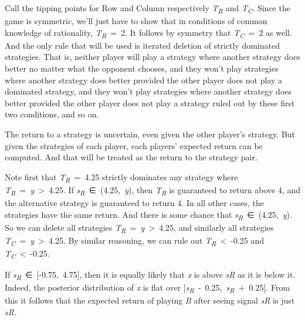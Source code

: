 \documentclass[
  12pt,
  letterpaper,
]{scrbook}
\begin{document}
Call the tipping points for Row and Column respectively
\emph{T\textsubscript{R}} and \emph{T\textsubscript{C}}. Since the game
is symmetric, we'll just have to show that in conditions of common
knowledge of rationality, \emph{T\textsubscript{R}}~=~2. It follows by
symmetry that \emph{T\textsubscript{C}}~=~2 as well. And the only rule
that will be used is iterated deletion of strictly dominated strategies.
That is, neither player will play a strategy where another strategy does
better no matter what the opponent chooses, and they won't play
strategies where another strategy does better provided the other player
does not play a dominated strategy, and they won't play strategies where
another strategy does better provided the other player does not play a
strategy ruled out by these first two conditions, and so on.

The return to a strategy is uncertain, even given the other player's
strategy. But given the strategies of each player, each players'
expected return can be computed. And that will be treated as the return
to the strategy pair.

Note first that \emph{T\textsubscript{R}}~=~4.25 strictly dominates any
strategy where \emph{T\textsubscript{R}}~=~\emph{y}~\textgreater~4.25.
If \emph{s\textsubscript{R}}~∈~(4.25,~\emph{y}), then
\emph{T\textsubscript{R}} is guaranteed to return above 4, and the
alternative strategy is guaranteed to return 4. In all other cases, the
strategies have the same return. And there is some chance that
\emph{s\textsubscript{R}}~∈~(4.25,~\emph{y}). So we can delete all
strategies \emph{T\textsubscript{R}}~=~\emph{y}~\textgreater~4.25, and
similarly all strategies
\emph{T\textsubscript{C}}~=~\emph{y}~\textgreater~4.25. By similar
reasoning, we can rule out \emph{T\textsubscript{R}}~\textless~-0.25 and
\emph{T\textsubscript{C}}~\textless~-0.25.

If \emph{s\textsubscript{R}}~∈~\([\)-0.75,~4.75\(]\), then it is equally
likely that \emph{x} is above \emph{sR} as it is below it. Indeed, the
posterior distribution of \emph{x} is flat over
\([\)\emph{s\textsubscript{R}}~-~0.25,~\emph{s\textsubscript{R}}~+~0.25\(]\).
From this it follows that the expected return of playing \emph{B} after
seeing signal \emph{sR} is just \emph{sR}.
\end{document}

